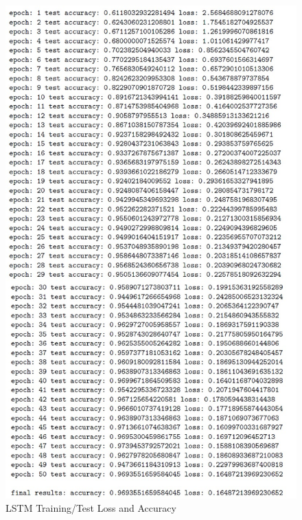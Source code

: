 \begin{appendices}
\setcounter{figure}{0}
\begin{figure}[ht!]%
    \centering
    \includegraphics[width=13cm]{images/LSTMloss}%
    \caption{LSTM Training/Test Loss and Accuracy}%
\end{figure}

\clearpage

\end{appendices}
